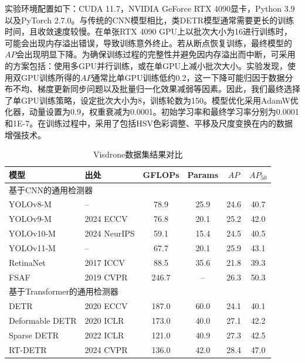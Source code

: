 实验环境配置如下：CUDA 11.7，NVIDIA GeForce RTX 4090显卡，Python 3.9以及PyTorch 2.7.0。与传统的CNN模型相比，类DETR模型通常需要更长的训练时间，且收敛速度较慢。在单张RTX 4090 GPU上以批次大小为16进行训练时，可能会出现内存溢出错误，导致训练意外终止。若从断点恢复训练，最终模型的$AP$会出现明显下降。为确保训练过程的完整性并避免因内存溢出而中断，可采用的方案包括：使用多GPU并行训练，或在单GPU上减小批次大小。实验发现，使用双GPU训练所得的$AP$通常比单GPU训练低约0.2，这一下降可能归因于数据分布不均、梯度更新同步问题以及批量归一化效果减弱等因素。因此，我们最终选择了单GPU训练策略，设定批次大小为8，训练轮数为150。模型优化采用AdamW优化器，动量设置为0.9，权重衰减为0.0001。初始学习率和最终学习率分别为0.0001和1E-7。在训练过程中，采用了包括HSV色彩调整、平移及尺度变换在内的数据增强技术。

\begin{table}[t]
  \centering
  \caption{Visdrone数据集结果对比}
  \label{tab1}
  \begin{tabular*}{0.9\textwidth}{@{\extracolsep{\fill}}llcccc}
    \toprule
    模型 & 出处 & GFLOPs& Params & $AP$ & $AP_{50}$ \\
    \midrule
    \multicolumn{6}{l}{基于CNN的通用检测器} \\
    \midrule
    YOLOv8-M & -- & 78.9 & 25.9 & 24.6 & 40.7 \\
    YOLOv9-M \cite{Wang2024Yolov9} & 2024 ECCV & 76.8 & 20.1 & 25.2 & 42.0 \\
    YOLOv10-M \cite{Wang2024Yolov10} & 2024 NeurIPS & 59.1 & 15.4 & 24.5 & 40.5 \\
    YOLOv11-M \cite{Jocher2023UltralyticsYOLO} & -- & 67.7 & 20.1 & 25.9 & 43.1 \\
    RetinaNet \cite{Lin2017FocalLoss} & 2017 ICCV & 88.5 & 35.6 & 21.8 & 39.3 \\
    FSAF \cite{Zhu2019FSAF} & 2019 CVPR & 246.7 & -- & 26.3 & 50.3 \\
    \midrule
    \multicolumn{6}{l}{基于Transformer的通用检测器} \\
    \midrule
    DETR \cite{Carion2020DETR} & 2020 ECCV & 187.0 & 60.0 & 24.1 & 40.1 \\
    Deformable DETR \cite{Zhu2020DeformableDETR} & 2020 ICLR & 173.0 & 40.0 & 27.1 & 42.2 \\
    Sparse DETR \cite{Roh2021SparseDETR} & 2022 ICLR & 121.0 & 40.9 & 27.3 & 42.5 \\
    RT-DETR \cite{Zhao202RTDETR} & 2024 CVPR & 136.0 & 42.0 & 28.4 & 47.0 \\

\end{tabular*}
\end{table}
